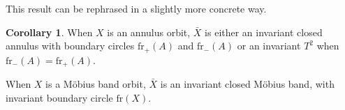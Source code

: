 \documentclass[10pt, oneside]{article}
\theoremstyle{definition}
\newtheorem{cor}{Corollary}
\theoremstyle{definition}
\begin{document}
This result can be rephrased in a slightly more concrete way.

\begin{cor}
    When $X$ is an annulus orbit, $\bar{X}$ is either an invariant closed annulus with boundary circles $\text{fr}_+(A)$ and $\text{fr}_-(A)$ or an invariant $T^2$ when $\text{fr}_-(A) = \text{fr}_+(A)$.

    When $X$ is a M\"{o}bius band orbit, $\bar{X}$ is an invariant closed M\"{o}bius band, with invariant boundary circle $\text{fr}(X)$.
\end{cor}

\listoftodos[Notes]
\end{document}
